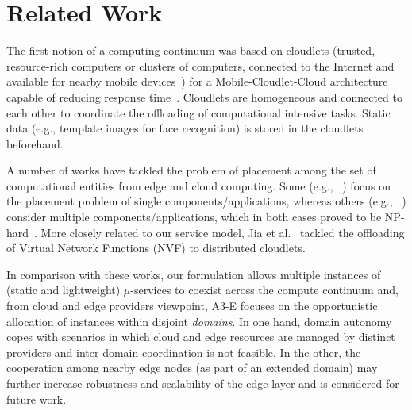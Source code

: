 \section{Related Work}
\label{sec:related}

The first notion of a computing continuum was based on cloudlets (trusted, resource-rich computers or clusters of computers, connected to the Internet and available for nearby mobile devices~\cite{Satyanarayanan09cloudlets}) for a Mobile-Cloudlet-Cloud architecture capable of reducing response time~\cite{Soyata:2012}. Cloudlets are homogeneous and connected to each other to coordinate the offloading of computational intensive tasks. Static data (e.g., template images for face recognition) is stored in the cloudlets beforehand. 


A number of works have tackled the problem of placement among the set of computational entities from edge and cloud computing. Some (e.g., ~\cite{Tarneberg2017}) focus on the placement problem of single components/applications, whereas others (e.g., ~\cite{Wang:2017,Yu18infocom}) consider multiple components/applications, which in both cases proved to be NP-hard~\cite{Yu18infocom}. 
More closely related to our service model, Jia et al.~\cite{Jia:2017} tackled the offloading of Virtual Network Functions (NVF) to distributed cloudlets. 



In comparison with these works, our formulation allows multiple instances of (static and lightweight) $\mu$-services to coexist across the compute continuum and, from cloud and edge providers viewpoint, A3-E focuses on the opportunistic allocation of instances within disjoint \textit{domains}. In one hand, domain autonomy copes with scenarios in which cloud and edge resources are managed by distinct providers and inter-domain coordination is not feasible. In the other, the cooperation among nearby edge nodes (as part of an extended domain) may further increase robustness and scalability of the edge layer and is considered for future work.

